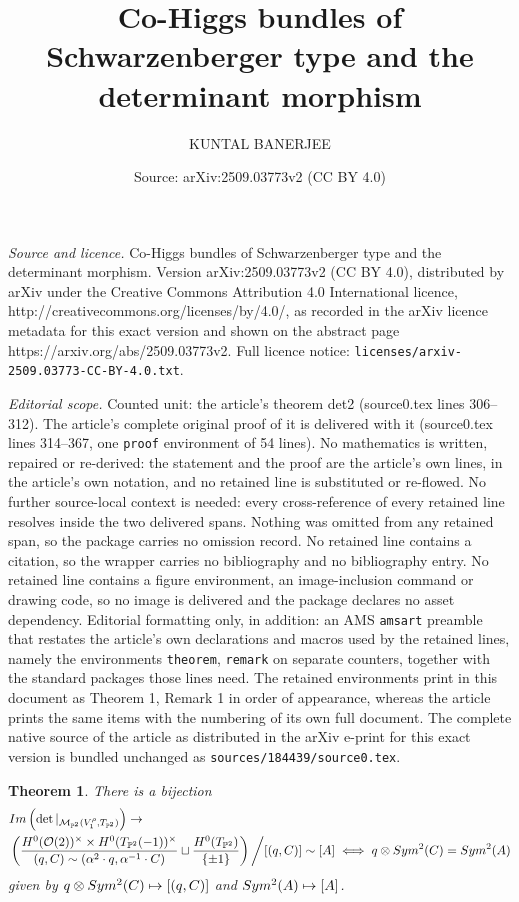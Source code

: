 \documentclass[10pt,a4paper]{amsart}
\title{Co-Higgs bundles of Schwarzenberger type and the determinant morphism}
\author{KUNTAL BANERJEE}
\date{Source: arXiv:2509.03773v2 (CC BY 4.0)}
\newtheorem{theorem}{Theorem}
\begin{document}
\maketitle

\noindent\emph{Source and licence.} Co-Higgs bundles of Schwarzenberger type and the determinant morphism. Version arXiv:2509.03773v2 (CC BY 4.0), distributed by arXiv under the Creative Commons Attribution 4.0 International licence, http://creativecommons.org/licenses/by/4.0/, as recorded in the arXiv licence metadata for this exact version and shown on the abstract page https://arxiv.org/abs/2509.03773v2. Full licence notice: \texttt{licenses/arxiv-2509.03773-CC-BY-4.0.txt}.\par\smallskip

\noindent\textit{Editorial scope.} Counted unit: the article's theorem det2 (source0.tex lines 306--312). The article's complete original proof of it is delivered with it (source0.tex lines 314--367, one \texttt{proof} environment of 54 lines). No mathematics is written, repaired or re-derived: the statement and the proof are the article's own lines, in the article's own notation, and no retained line is substituted or re-flowed.  No further source-local context is needed: every cross-reference of every retained line resolves inside the two delivered spans.  Nothing was omitted from any retained span, so the package carries no omission record.  No retained line contains a citation, so the wrapper carries no bibliography and no bibliography entry.  No retained line contains a figure environment, an image-inclusion command or drawing code, so no image is delivered and the package declares no asset dependency.  Editorial formatting only, in addition: an AMS \texttt{amsart} preamble that restates the article's own declarations and macros used by the retained lines, namely the environments \texttt{theorem}, \texttt{remark} on separate counters, together with the standard packages those lines need.  The retained environments print in this document as Theorem 1, Remark 1 in order of appearance, whereas the article prints the same items with the numbering of its own full document.  The complete native source of the article as distributed in the arXiv e-print for this exact version is bundled unchanged as \texttt{sources/184439/source0.tex}.
\begin{theorem}\label{det2}
There is a bijection 
\begin{align*}
&\emph{Im}\left(\det|_{\mathcal{M}_{\mathbb{P}^2}(V_1^\rho, T_{\mathbb{P}^2})}\right)\to\\
&\left(\frac{H^0(\mathcal{O}(2))^\times\times H^0(T_{\mathbb{P}^2}(-1))^\times}{(q, C)\sim (\alpha^2\cdot q, \alpha^{-1}\cdot C)}\sqcup\frac{H^0(T_{\mathbb{P}^2})}{\{\pm 1\}}\right)\bigg/[(q, C)]\sim [A]\iff q\otimes\emph{Sym}^2(C) = \emph{Sym}^2(A)
\end{align*} given by $q\otimes\emph{Sym}^2(C)\mapsto [(q, C)]$ and $\emph{Sym}^2(A)\mapsto [A]$.
\end{theorem}
\end{document}

